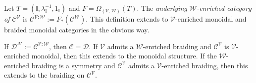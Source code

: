 \begin{defi}
    \label{Def:UnderlyingDCat}
    Let $T = ( \mathbb{I}, \lambda_{\mathbb{I}}^{-1}, 1_{\mathbb{I}} )$ and $F = \Omega_{(\mathcal{V},\mathcal{W})}( T )$.
    The \emph{underlying $\mathcal{W}$-enriched category of $\mathcal{C}^{\mathcal{V}}$} is $\mathcal{C}^{\mathcal{V}:\mathcal{W}} := F_*( \mathcal{C}^{\mathcal{W}} )$.
    This definition extends to $\mathcal{V}$-enriched monoidal and braided monoidal categories in the obvious way.
\end{defi}

\begin{thm}
    \label{Thm:UnderlyingDCat}
    If $\mathcal{D}^{\mathcal{W}} := \mathcal{C}^{\mathcal{V}:\mathcal{W}}$, then $\mathcal{C} = \mathcal{D}$.
    If $\mathcal{V}$ admits a $\mathcal{W}$-enriched braiding and $\mathcal{C}^{\mathcal{V}}$ is $\mathcal{V}$-enriched monoidal, then this extends to the monoidal structure.
    If the $\mathcal{W}$-enriched braiding is a symmetry and $\mathcal{C}^{\mathcal{V}}$ admits a $\mathcal{V}$-enriched braiding, then this extends to the braiding on $\mathcal{C}^{\mathcal{V}}$.
\end{thm}

